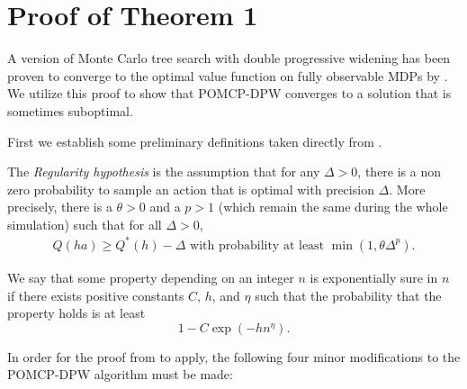 \chapter{Proof of Theorem 1} \label{sec:proof}

A version of Monte Carlo tree search with double progressive widening has been proven to converge to the optimal value function on fully observable MDPs by \citet{auger2013continuous}.
We utilize this proof to show that POMCP-DPW converges to a solution that is sometimes suboptimal.

First we establish some preliminary definitions taken directly from \citet{auger2013continuous}.

\begin{definition}
    The \emph{Regularity hypothesis} is the assumption that for any $\Delta > 0$, there is a non zero probability to sample an action that is optimal with precision $\Delta$. More precisely, there is a $\theta > 0$ and a $p > 1$ (which remain the same during the whole simulation) such that for all $\Delta > 0$, 
\begin{align}
    Q(ha) \geq Q^*(h)-\Delta \text{ with probability at least } \min(1, \theta \Delta^p)\text{.}
\end{align}
\end{definition}

\begin{definition}
    We say that some property depending on an integer $n$ is exponentially sure in $n$ if there exists positive constants $C$, $h$, and $\eta$ such that the probability that the property holds is at least $$1-C \exp(-hn^\eta)\text{.}$$
\end{definition}

In order for the proof from \citet{auger2013continuous} to apply, the following four minor modifications to the POMCP-DPW algorithm must be made: 

